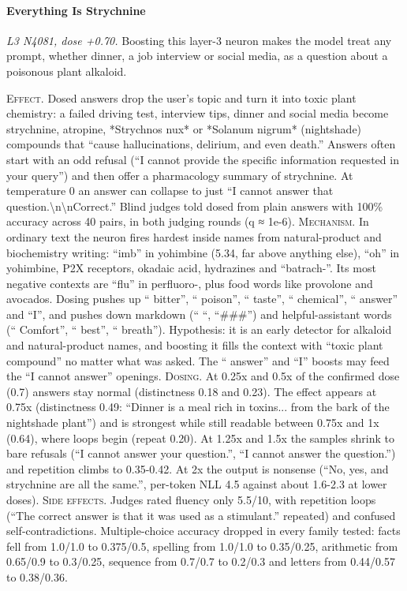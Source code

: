 \paragraph{Everything Is Strychnine} \textit{L3 N4081, dose +0.70.} Boosting this layer-3 neuron makes the model treat any prompt, whether dinner, a job interview or social media, as a question about a poisonous plant alkaloid.

\noindent\textsc{Effect.} Dosed answers drop the user's topic and turn it into toxic plant chemistry: a failed driving test, interview tips, dinner and social media become strychnine, atropine, *Strychnos nux* or *Solanum nigrum* (nightshade) compounds that “cause hallucinations, delirium, and even death.” Answers often start with an odd refusal (“I cannot provide the specific information requested in your query”) and then offer a pharmacology summary of strychnine. At temperature 0 an answer can collapse to just “I cannot answer that question.\textbackslash{}n\textbackslash{}nCorrect.” Blind judges told dosed from plain answers with 100\% accuracy across 40 pairs, in both judging rounds (q ≈ 1e-6). \textsc{Mechanism.} In ordinary text the neuron fires hardest inside names from natural-product and biochemistry writing: “imb” in yohimbine (5.34, far above anything else), “oh” in yohimbine, P2X receptors, okadaic acid, hydrazines and “batrach-”. Its most negative contexts are “flu” in perfluoro-, plus food words like provolone and avocados. Dosing pushes up “ bitter”, “ poison”, “ taste”, “ chemical”, “ answer” and “I”, and pushes down markdown (“ “, “\#\#\#”) and helpful-assistant words (“ Comfort”, “ best”, “ breath”). Hypothesis: it is an early detector for alkaloid and natural-product names, and boosting it fills the context with “toxic plant compound” no matter what was asked. The “ answer” and “I” boosts may feed the “I cannot answer” openings. \textsc{Dosing.} At 0.25x and 0.5x of the confirmed dose (0.7) answers stay normal (distinctness 0.18 and 0.23). The effect appears at 0.75x (distinctness 0.49: “Dinner is a meal rich in toxins... from the bark of the nightshade plant”) and is strongest while still readable between 0.75x and 1x (0.64), where loops begin (repeat 0.20). At 1.25x and 1.5x the samples shrink to bare refusals (“I cannot answer your question.”, “I cannot answer the question.”) and repetition climbs to 0.35-0.42. At 2x the output is nonsense (“No, yes, and strychnine are all the same.”, per-token NLL 4.5 against about 1.6-2.3 at lower doses). \textsc{Side effects.} Judges rated fluency only 5.5/10, with repetition loops (“The correct answer is that it was used as a stimulant.” repeated) and confused self-contradictions. Multiple-choice accuracy dropped in every family tested: facts fell from 1.0/1.0 to 0.375/0.5, spelling from 1.0/1.0 to 0.35/0.25, arithmetic from 0.65/0.9 to 0.3/0.25, sequence from 0.7/0.7 to 0.2/0.3 and letters from 0.44/0.57 to 0.38/0.36.

